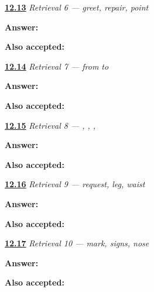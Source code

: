 \noindent\begin{minipage}[t]{\linewidth}
\raggedright
\hyperlink{review-JA-R12-repair-01-card}{\textbf{12.13}} \emph{Retrieval 6 — greet, repair, point}\par
\small \textbf{Answer:} \par
\footnotesize \textbf{Also accepted:}    
\end{minipage}\par\medskip

\noindent\begin{minipage}[t]{\linewidth}
\raggedright
\hyperlink{review-JA-R12-repair-02-card}{\textbf{12.14}} \emph{Retrieval 7 — from  to }\par
\small \textbf{Answer:} \par
\footnotesize \textbf{Also accepted:}     
\end{minipage}\par\medskip

\noindent\begin{minipage}[t]{\linewidth}
\raggedright
\hyperlink{review-JA-R12-repair-03-card}{\textbf{12.15}} \emph{Retrieval 8 — , , , }\par
\small \textbf{Answer:} \par
\footnotesize \textbf{Also accepted:}    
\end{minipage}\par\medskip

\noindent\begin{minipage}[t]{\linewidth}
\raggedright
\hyperlink{review-JA-R12-repair-04-card}{\textbf{12.16}} \emph{Retrieval 9 — request, leg, waist}\par
\small \textbf{Answer:} \par
\footnotesize \textbf{Also accepted:}     
\end{minipage}\par\medskip

\noindent\begin{minipage}[t]{\linewidth}
\raggedright
\hyperlink{review-JA-R12-writing-01-card}{\textbf{12.17}} \emph{Retrieval 10 — mark, signs, nose}\par
\small \textbf{Answer:} \par
\footnotesize \textbf{Also accepted:}    
\end{minipage}\par\medskip


